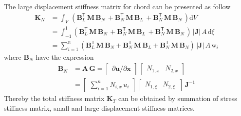 The large displacement stiffness matrix for chord can be presented as follow
\begin{equation}
\begin{aligned}
\mathbf{K}_{N} & =  \int_{V} \,  \left(\mathbf{B}_L^{\mathsf{T}} \, \mathbf{M} \, \mathbf{B}_N \, + \mathbf{B}_N^{\mathsf{T}} \, \mathbf{M} \, \mathbf{B}_L \, + \mathbf{B}_N^{\mathsf{T}} \, \mathbf{M} \, \mathbf{B}_N \,  \right) \mathrm{d} V \\
& = \int_{-1}^{1} \left(\mathbf{B}_L^{\mathsf{T}} \, \mathbf{M} \, \mathbf{B}_N \, + \mathbf{B}_N^{\mathsf{T}} \, \mathbf{M} \, \mathbf{B}_L \, + \mathbf{B}_N^{\mathsf{T}} \, \mathbf{M} \, \mathbf{B}_N \,  \right) \, |\mathbf{J}|  \, A \,  \mathrm{d} \xi \\
& = \sum_{i=1}^{n}  \left(\mathbf{B}_L^{\mathsf{T}} \, \mathbf{M} \, \mathbf{B}_N + \mathbf{B}_N^{\mathsf{T}} \, \mathbf{M} \, \mathbf{B}_L + \mathbf{B}_N^{\mathsf{T}} \, \mathbf{M} \, \mathbf{B}_N \right) \, |\mathbf{J}| \, A \, \mathrm{w}_i
\end{aligned}
\end{equation}
where $\mathbf{B}_N$ have the expression 
\begin{equation}
\begin{aligned}
\mathbf{B}_{N} & =  \mathbf{A} \, \mathbf{G} = \begin{bmatrix}
\partial \mathbf{u} / \partial \mathbf{x} 
\end{bmatrix} \, \begin{bmatrix}
 N_{1,x} &  N_{2,x}
\end{bmatrix} \\
& = \begin{bmatrix}
\sum\nolimits_{i=1}^n N_{i,x} \, u_i
\end{bmatrix} \, \begin{bmatrix}
 N_{1,\xi} &   N_{2,\xi} \, 
\end{bmatrix} \, \mathbf{J}^{-1}
\end{aligned}
\end{equation}
Thereby the total stiffness matrix $\mathbf{K}_T$ can be obtained by summation of stress stiffness matrix, small and large displacement stiffness matrices.

